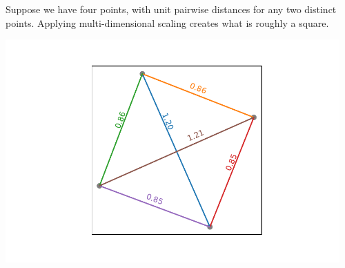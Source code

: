 Suppose we have four points, with unit pairwise distances for any two distinct points. Applying multi-dimensional scaling creates what is roughly a square.

\begin{center}
    \includegraphics[width = 0.96\textwidth]{Images/MDS_social.pdf}
\end{center}